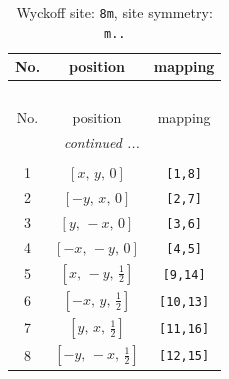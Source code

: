 \documentclass[fleqn,8pt]{jsarticle}
\begin{document}
\begin{longtable}{ccc}
\caption{Wyckoff site: {\tt 8m}, site symmetry: {\tt m..}}
 \\
 \hline \hline
No. & position & mapping \\ \hline \endfirsthead

\multicolumn{2}{l}{\tablename\ \thetable{}} \\
 \hline \hline
No. & position & mapping \\ \hline \endhead

 \hline \hline
\multicolumn{2}{r}{\footnotesize\it continued ...} \\ \endfoot

 \hline \hline
\multicolumn{2}{r}{} \\ \endlastfoot

1 & $\left[ x,\, y,\, 0 \right]$ & {\tt [1,8]} \\ \hline
2 & $\left[ - y,\, x,\, 0 \right]$ & {\tt [2,7]} \\ \hline
3 & $\left[ y,\, - x,\, 0 \right]$ & {\tt [3,6]} \\ \hline
4 & $\left[ - x,\, - y,\, 0 \right]$ & {\tt [4,5]} \\ \hline
5 & $\left[ x,\, - y,\, \frac{1}{2} \right]$ & {\tt [9,14]} \\ \hline
6 & $\left[ - x,\, y,\, \frac{1}{2} \right]$ & {\tt [10,13]} \\ \hline
7 & $\left[ y,\, x,\, \frac{1}{2} \right]$ & {\tt [11,16]} \\ \hline
8 & $\left[ - y,\, - x,\, \frac{1}{2} \right]$ & {\tt [12,15]} \\
\end{longtable}
\renewcommand{\arraystretch}{1.2}
\end{document}
